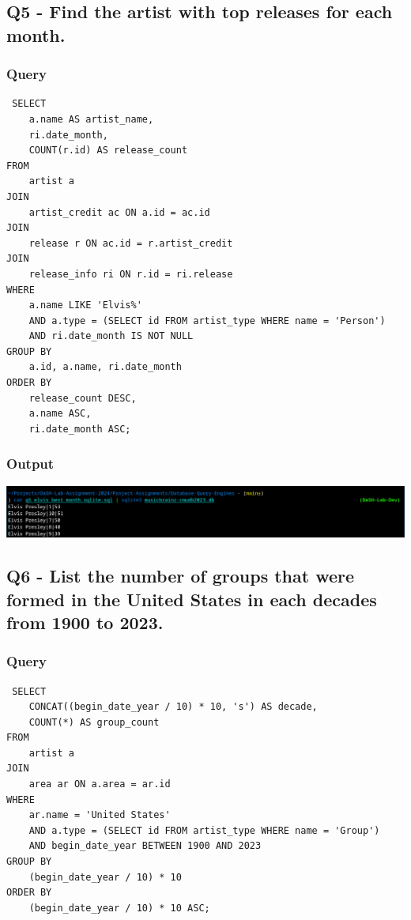 \documentclass[11pt]{article}
\begin{document}
\subsection{Q5 - Find the artist with top releases for each month.}
\label{sec:orgd42319f}
\subsubsection{Query}
\label{sec:org4acb040}
\begin{verbatim}
 SELECT
    a.name AS artist_name,
    ri.date_month,
    COUNT(r.id) AS release_count
FROM
    artist a
JOIN
    artist_credit ac ON a.id = ac.id
JOIN
    release r ON ac.id = r.artist_credit
JOIN
    release_info ri ON r.id = ri.release
WHERE
    a.name LIKE 'Elvis%'
    AND a.type = (SELECT id FROM artist_type WHERE name = 'Person')
    AND ri.date_month IS NOT NULL
GROUP BY
    a.id, a.name, ri.date_month
ORDER BY
    release_count DESC,
    a.name ASC,
    ri.date_month ASC;
\end{verbatim}
\subsubsection{Output}
\label{sec:orgd3ea563}
\begin{center}
\includegraphics[width=.9\linewidth]{./images/Q5.png}
\end{center}
\subsection{Q6 - List the number of groups that were formed in the United States in each decades from 1900 to 2023.}
\label{sec:orgb62de75}
\subsubsection{Query}
\label{sec:org9bc3efa}
\begin{verbatim}
 SELECT
    CONCAT((begin_date_year / 10) * 10, 's') AS decade,
    COUNT(*) AS group_count
FROM
    artist a
JOIN
    area ar ON a.area = ar.id
WHERE
    ar.name = 'United States'
    AND a.type = (SELECT id FROM artist_type WHERE name = 'Group')
    AND begin_date_year BETWEEN 1900 AND 2023
GROUP BY
    (begin_date_year / 10) * 10
ORDER BY
    (begin_date_year / 10) * 10 ASC;
\end{verbatim}
\end{document}

